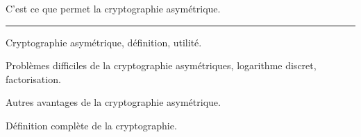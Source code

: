 C’est ce que permet la cryptographie asymétrique. 

\vskip2cm
\hrule
\vskip2cm

Cryptographie asymétrique, définition, utilité.

Problèmes difficiles de la cryptographie asymétriques, logarithme discret, factorisation.

Autres avantages de la cryptographie asymétrique.

Définition complète de la cryptographie.









